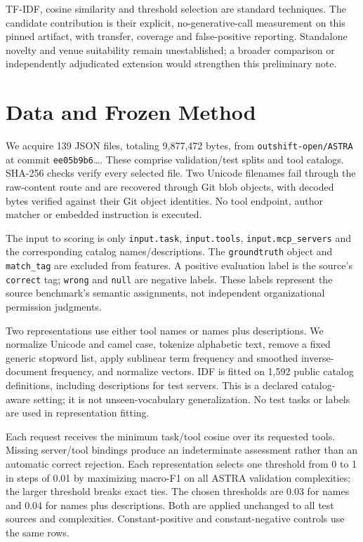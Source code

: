 \documentclass[sigconf,nonacm]{acmart}
\begin{document}
TF-IDF, cosine similarity and threshold selection are standard techniques. The candidate contribution is their explicit, no-generative-call measurement on this pinned artifact, with transfer, coverage and false-positive reporting. Standalone novelty and venue suitability remain unestablished; a broader comparison or independently adjudicated extension would strengthen this preliminary note.

\section{Data and Frozen Method}
We acquire 139 JSON files, totaling 9,877,472 bytes, from \texttt{outshift-open/ASTRA} at commit \texttt{ee05b9b6}\ldots. These comprise validation/test splits and tool catalogs. SHA-256 checks verify every selected file. Two Unicode filenames fail through the raw-content route and are recovered through Git blob objects, with decoded bytes verified against their Git object identities. No tool endpoint, author matcher or embedded instruction is executed.

The input to scoring is only \texttt{input.task}, \texttt{input.tools}, \texttt{input.mcp\_servers} and the corresponding catalog names/descriptions. The \texttt{groundtruth} object and \texttt{match\_tag} are excluded from features. A positive evaluation label is the source's \texttt{correct} tag; \texttt{wrong} and \texttt{null} are negative labels. These labels represent the source benchmark's semantic assignments, not independent organizational permission judgments.

Two representations use either tool names or names plus descriptions. We normalize Unicode and camel case, tokenize alphabetic text, remove a fixed generic stopword list, apply sublinear term frequency and smoothed inverse-document frequency, and normalize vectors. IDF is fitted on 1,592 public catalog definitions, including descriptions for test servers. This is a declared catalog-aware setting; it is not unseen-vocabulary generalization. No test tasks or labels are used in representation fitting.

Each request receives the minimum task/tool cosine over its requested tools. Missing server/tool bindings produce an indeterminate assessment rather than an automatic correct rejection. Each representation selects one threshold from 0 to 1 in steps of 0.01 by maximizing macro-F1 on all ASTRA validation complexities; the larger threshold breaks exact ties. The chosen thresholds are 0.03 for names and 0.04 for names plus descriptions. Both are applied unchanged to all test sources and complexities. Constant-positive and constant-negative controls use the same rows.
\end{document}
